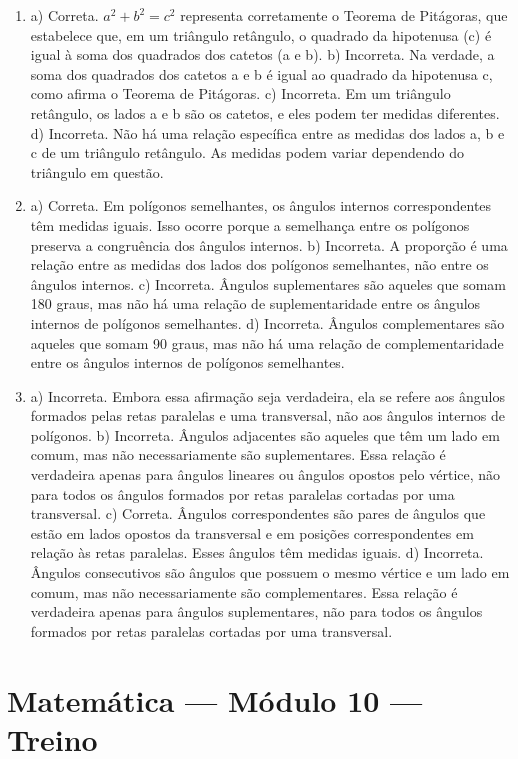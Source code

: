 \begin{enumerate}
\item a) Correta. $a^2 + b^2 = c^2$ representa corretamente o Teorema de Pitágoras, que estabelece que, em um triângulo retângulo, o quadrado da
hipotenusa (c) é igual à soma dos quadrados dos catetos (a e b).
b) Incorreta. Na verdade, a soma dos quadrados dos catetos a e b é igual ao quadrado da hipotenusa c, como afirma o Teorema de Pitágoras.
c) Incorreta. Em um triângulo retângulo, os lados a e b são os catetos, e eles podem ter medidas diferentes.
d) Incorreta. Não há uma relação específica entre as medidas dos lados a, b e c de um triângulo retângulo. As medidas podem variar dependendo do triângulo em questão.

\item a) Correta. Em polígonos semelhantes, os ângulos internos
correspondentes têm medidas iguais. Isso ocorre porque a semelhança entre os polígonos preserva a congruência dos ângulos internos.
b) Incorreta. A proporção é uma relação entre as medidas dos lados dos polígonos semelhantes, não entre os ângulos internos.
c) Incorreta. Ângulos suplementares são aqueles que somam 180 graus, mas não há uma relação de suplementaridade entre os ângulos internos de polígonos semelhantes.
d) Incorreta. Ângulos complementares são aqueles que somam 90 graus, mas não há uma relação de complementaridade entre os ângulos internos de polígonos semelhantes.

\item a) Incorreta. Embora essa afirmação seja verdadeira, ela se refere aos ângulos formados pelas retas paralelas e uma transversal, não aos ângulos internos de polígonos.
b) Incorreta. Ângulos adjacentes são aqueles que têm um lado em comum, mas não necessariamente são suplementares. Essa relação é verdadeira apenas para ângulos lineares ou ângulos opostos pelo vértice,
não para todos os ângulos formados por retas paralelas cortadas por uma transversal.
c) Correta. Ângulos correspondentes são pares de ângulos que estão em lados opostos da transversal e em posições correspondentes em relação às retas paralelas. Esses ângulos têm medidas iguais.
d) Incorreta. Ângulos consecutivos são ângulos que possuem o mesmo vértice e um lado em comum, mas não necessariamente são complementares.
Essa relação é verdadeira apenas para ângulos suplementares, não para todos os ângulos formados por retas paralelas cortadas por uma transversal.
\end{enumerate}

\section*{Matemática — Módulo 10 — Treino}

